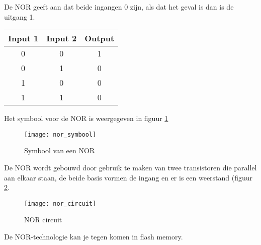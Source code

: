 De NOR geeft aan dat beide ingangen 0 zijn, als dat het geval is dan is de uitgang 1.

\begin{tabular}{ |c|c|c| }
\hline
\rowcolor{gray!60}
	Input 1 & Input 2 & Output \\
	\hline
	0 & 0 & 1 \\
	\hline
	0 & 1 & 0 \\
	\hline
	1 & 0 & 0 \\
	\hline
	1 & 1 & 0 \\
	\hline
\end{tabular}

Het symbool voor de NOR is weergegeven in figuur \ref{symbool:nor}

\begin{figure}[h]
\texttt{[image: nor\_symbool]}
\centering
\caption{Symbool van een NOR}
\label{symbool:nor}
\end{figure}

De NOR wordt gebouwd door gebruik te maken van twee transistoren die parallel aan elkaar staan, de beide basis vormen de ingang en er is een weerstand (figuur \ref{circuit:nor}.

\begin{figure}[h]
\texttt{[image: nor\_circuit]}
\centering
\caption{NOR circuit}
\label{circuit:nor}
\end{figure}

De NOR-technologie kan je tegen komen in flash memory.

